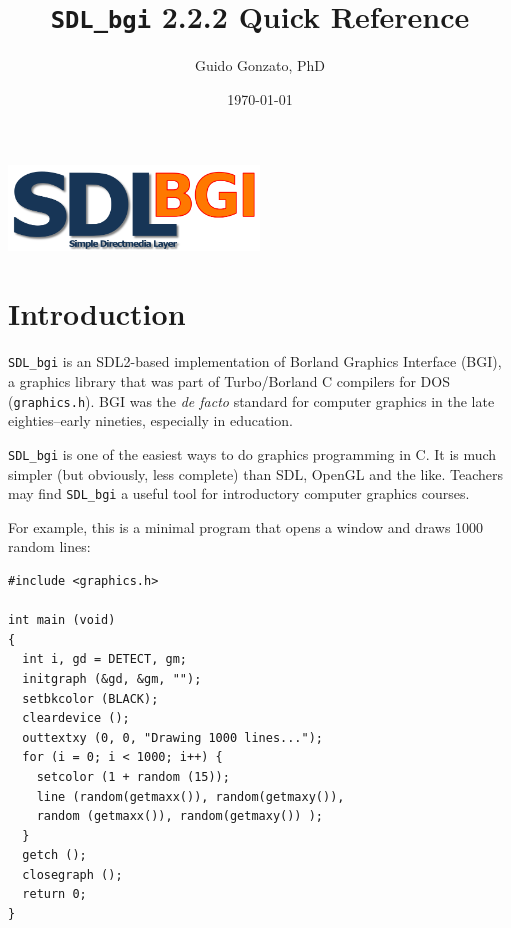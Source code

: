 \documentclass[a4paper,11pt]{article}
\newcommand{\SDLbgi}{\texttt{SDL\_bgi}}
\newcommand{\version}{2.2.2}        %
\begin{document}
\title{\SDLbgi{} \version{} Quick Reference}

\author{Guido Gonzato, PhD}

\date{\today}

\maketitle

\begin{center}
  \includegraphics[width=0.5\textwidth]{SDL_bgi_logo.png}  
\end{center}


\section{Introduction}

\SDLbgi{} is an SDL2-based implementation of Borland Graphics
Interface (BGI), a graphics library that was part of Turbo/Borland C
compilers for DOS (\texttt{graphics.h}). BGI was the \emph{de facto}
standard for computer graphics in the late eighties--early nineties,
especially in education.

\SDLbgi{} is one of the easiest ways to do graphics programming in C.
It is much simpler (but obviously, less complete) than SDL, OpenGL and
the like. Teachers may find \SDLbgi{} a useful tool for introductory
computer graphics courses.

For example, this is a minimal program that opens a window and draws
1000 random lines:

\begin{small}
\begin{verbatim}
#include <graphics.h>

int main (void)
{
  int i, gd = DETECT, gm;
  initgraph (&gd, &gm, "");
  setbkcolor (BLACK);
  cleardevice ();
  outtextxy (0, 0, "Drawing 1000 lines...");
  for (i = 0; i < 1000; i++) {
    setcolor (1 + random (15));
    line (random(getmaxx()), random(getmaxy()),
    random (getmaxx()), random(getmaxy()) );
  }
  getch ();
  closegraph ();
  return 0;
}
\end{verbatim}
\end{small}
\end{document}
